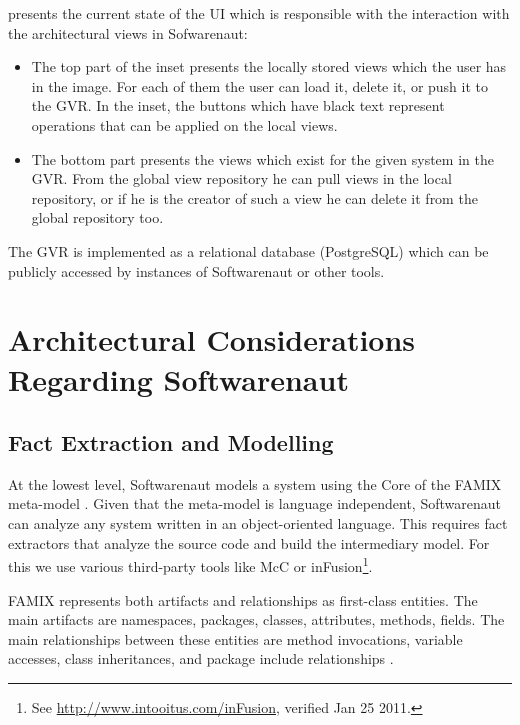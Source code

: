 \documentclass[preprint,12pt]{elsarticle}
\begin{document}
 presents the current state of the UI which is responsible with the interaction with the architectural views in Sofwarenaut: 

\begin{itemize}

\item The top part of the inset presents the locally stored views which the user has in the image. For each of them the user can load it, delete it, or push it to the GVR. In the inset, the buttons which have black text represent operations that can be applied on the local views.

\item The bottom part presents the views which exist for the given system in the GVR. From the global view repository he can pull views in the local repository, or if he is the creator of such a view he can delete it from the global repository too. 

\end{itemize}

The GVR is implemented as a relational database (PostgreSQL) which can be publicly accessed by instances of Softwarenaut or other tools. 

\section {Architectural Considerations Regarding Softwarenaut} 

\subsection {Fact Extraction and Modelling} \label{sec:facts}

At the lowest level, Softwarenaut models a system using the Core of the FAMIX meta-model \cite{tichelaar-thesis}. Given that the meta-model is language independent, Softwarenaut can analyze any system written in an object-oriented language. This requires fact extractors that analyze the source code and build the intermediary model. For this we use various third-party tools like McC \cite{pepi-mcc} or inFusion\footnote{See \url{http://www.intooitus.com/inFusion}, verified Jan 25 2011.}.  

FAMIX represents both artifacts and relationships as first-class entities. The main artifacts are namespaces, packages, classes, attributes, methods, fields. The main relationships between these entities are method invocations, variable accesses, class inheritances, and package include relationships \cite{tichelaar-thesis}.
\end{document}
